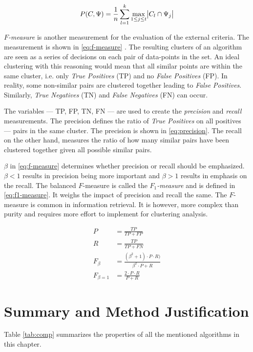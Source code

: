 \documentclass[../report.tex]{subfiles}
\begin{document}
\begin{equation}
  \label{eq:purity}
  P(C, \Psi) = \frac{1}{n}\sum^{k}_{l=1}\max_{1 \leq j \leq t}\abs{C_l \cap \Psi_j}
\end{equation}

\textit{$F$-measure} is another measurement for the evaluation of the external criteria. The measurement is shown in \cref{eq:f-measure} \cite{manning2010introduction}. The resulting clusters of an algorithm are seen as a series of decisions on each pair of data-points in the set. An ideal clustering with this reasoning would mean that all similar points are within the same cluster, i.e. only \textit{True Positives} (TP) and no \textit{False Positives} (FP). In reality, some non-similar pairs are clustered together leading to \textit{False Positives}. Similarly, \textit{True Negatives} (TN) and \textit{False Negatives} (FN) can occur.

The variables --- TP, FP, TN, FN --- are used to create the \textit{precision} and \textit{recall} measurements. The precision defines the ratio of \textit{True Positives} on all positives --- pairs in the same cluster. The precision is shown in \cref{eq:precision}. The recall on the other hand, measures the ratio of how many similar pairs have been clustered together given all possible similar pairs. 

$\beta$ in \cref{eq:f-measure} determines whether precision or recall should be emphasized. $\beta < 1$ results in precision being more important and $\beta > 1$ results in emphasis on the recall. The balanced $F$-measure is called the \textit{$F_1$-measure} and is defined in \cref{eq:f1-measure}. It weighs the impact of precision and recall the same. The $F$-measure is common in information retrieval. It is however, more complex than purity and requires more effort to implement for clustering analysis.

\begin{align}
  \label{eq:precision}
  P &= \frac{TP}{TP+FP} \\
  \label{eq:recall}
  R &= \frac{TP}{TP+FN} \\
  \label{eq:f-measure}
  F_\beta &= \frac{(\beta^2 + 1) \cdot P \cdot R)}{\beta^2 \cdot P + R} \\
  \label{eq:f1-measure}
  F_{\beta = 1} &= \frac{2 \cdot P \cdot R}{P + R}
\end{align}

\section{Summary and Method Justification}
Table \cref{tab:comp} summarizes the properties of all the mentioned algorithms in this chapter.\newline
\end{document}
